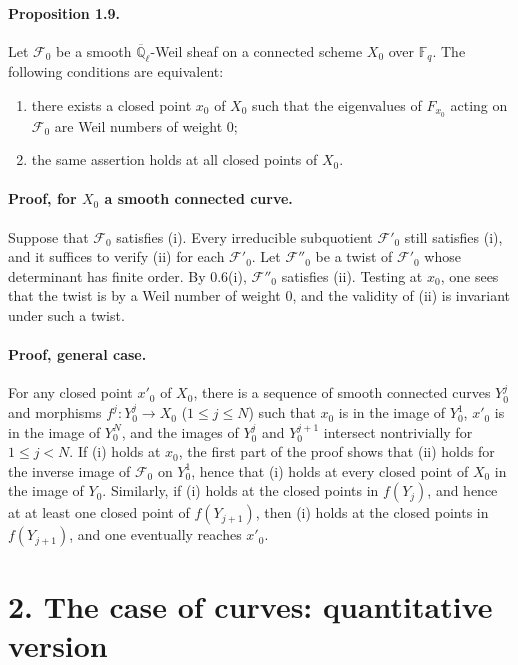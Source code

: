 \documentclass[11pt]{article}
\newcommand{\F}{\mathbb{F}}
\newcommand{\Ql}{\overline{\mathbb Q}_{\ell}}
\begin{document}
\paragraph{Proposition 1.9.}
Let $\mathcal F_0$ be a smooth $\Ql$-Weil sheaf on a connected scheme $X_0$ over $\F_q$.
The following conditions are equivalent:
\begin{enumerate}[label=(\roman*)]
\item there exists a closed point $x_0$ of $X_0$ such that the eigenvalues of $F_{x_0}$ acting on $\mathcal F_0$ are Weil numbers of weight $0$;
\item the same assertion holds at all closed points of $X_0$.
\end{enumerate}

\paragraph{Proof, for $X_0$ a smooth connected curve.}
Suppose that $\mathcal F_0$ satisfies (i).
Every irreducible subquotient $\mathcal F'_0$ still satisfies (i), and it suffices to verify (ii) for each $\mathcal F'_0$.
Let $\mathcal F''_0$ be a twist of $\mathcal F'_0$ whose determinant has finite order.
By 0.6(i), $\mathcal F''_0$ satisfies (ii).
Testing at $x_0$, one sees that the twist is by a Weil number of weight $0$, and the validity of (ii) is invariant under such a twist.

\paragraph{Proof, general case.}
For any closed point $x'_0$ of $X_0$, there is a sequence of smooth connected curves $Y_0^j$ and morphisms $f^j:Y_0^j\to X_0$ ($1\le j\le N$) such that $x_0$ is in the image of $Y_0^1$, $x'_0$ is in the image of $Y_0^N$, and the images of $Y_0^j$ and $Y_0^{j+1}$ intersect nontrivially for $1\le j<N$.
If (i) holds at $x_0$, the first part of the proof shows that (ii) holds for the inverse image of $\mathcal F_0$ on $Y_0^1$, hence that (i) holds at every closed point of $X_0$ in the image of $Y_0$.
Similarly, if (i) holds at the closed points in $f(Y_j)$, and hence at at least one closed point of $f(Y_{j+1})$, then (i) holds at the closed points in $f(Y_{j+1})$, and one eventually reaches $x'_0$.

\section*{2. The case of curves: quantitative version}
\end{document}
